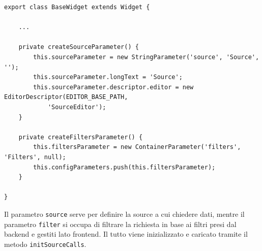 \begin{lstlisting}[caption={Creazione dei parametri all'interno della classe BaseWidget}, style=javaScriptCode]
export class BaseWidget extends Widget {

    ...

    private createSourceParameter() {
        this.sourceParameter = new StringParameter('source', 'Source', '');
        this.sourceParameter.longText = 'Source';
        this.sourceParameter.descriptor.editor = new EditorDescriptor(EDITOR_BASE_PATH,
            'SourceEditor');
    }

    private createFiltersParameter() {
        this.filtersParameter = new ContainerParameter('filters', 'Filters', null);
        this.configParameters.push(this.filtersParameter);
    }

}
\end{lstlisting}
Il parametro \verb|source| serve per definire la source a cui chiedere dati, mentre il parametro \verb|filter| si occupa di filtrare la richiesta in base ai filtri presi dal backend e gestiti lato frontend. Il tutto viene inizializzato e caricato tramite il metodo \verb|initSourceCalls|.

